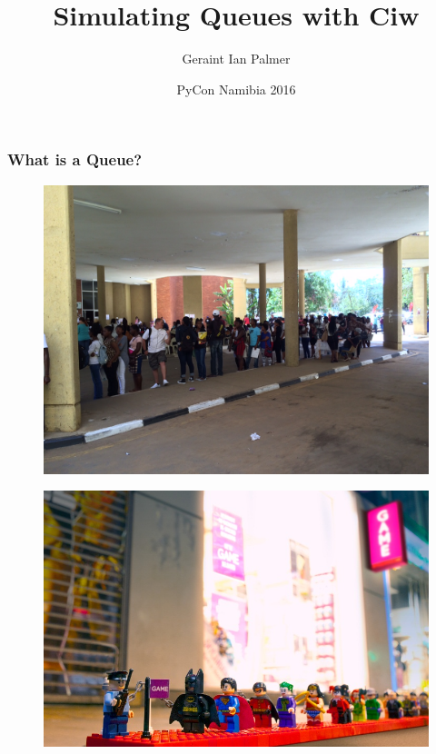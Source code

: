 \documentclass{beamer}
\title
{Simulating Queues with Ciw}
\author{Geraint Ian Palmer}
\date{PyCon Namibia 2016}
\begin{document}
\frame{\titlepage}

\begin{frame}
\frametitle{What is a Queue?}
\begin{figure}
  
\end{figure}
\end{frame}

\begin{frame}
\begin{figure}
    \includegraphics[width=\textwidth]{UNAMqueue}
\end{figure}
\end{frame}

\begin{frame}
\begin{figure}
    \includegraphics[width=\textwidth]{legoqueue}
\end{figure}
\end{frame}
\end{document}
